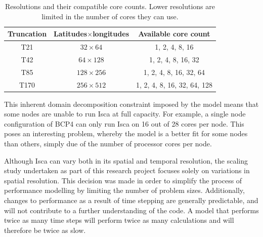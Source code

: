 \documentclass[a4paper,11pt]{report}
\begin{document}
\begin{table}[htbp]
\caption[Resolutions and their compatible core counts]{Resolutions and their compatible core counts. Lower resolutions are limited in the number of cores they can use.}
\begin{center}
\begin{tabular}{ c c c }
\toprule
Truncation 	& Latitudes$\times$longitudes 		& Available core count \\\midrule
 T21 			& $32\times64$					& 1, 2, 4, 8, 16 \\  
 T42 			& $64\times128$				& 1, 2, 4, 8, 16, 32 \\
 T85 			& $128\times256$ 				& 1, 2, 4, 8, 16, 32, 64 \\
 T170 		& $256\times512$ 				& 1, 2, 4, 8, 16, 32, 64, 128    \\\bottomrule
\end{tabular}
\label{tbl:resolutions}
\end{center}
\end{table}
\par
This inherent domain decomposition constraint imposed by the model means that some nodes are unable to run Isca at full capacity. For example, a single node configuration of BCP4 can only run  Isca on 16 out of 28 cores per node. This poses an interesting problem, whereby the model is a better fit for some nodes than others, simply due of the number of processor cores per node. 
\par
Although Isca can vary both in its spatial and temporal resolution, the scaling study undertaken as part of this research project focuses solely on variations in spatial resolution. This decision was made in order to simplify the process of performance modelling by limiting the number of problem sizes. Additionally, changes to performance as a result of time stepping are generally predictable, and will not contribute to a further understanding of the code. A model that performs twice as many time steps will perform twice as many calculations and will therefore be twice as slow. 
\end{document}
